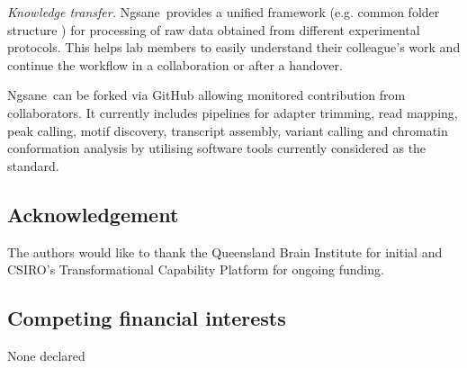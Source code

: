 \documentclass{bioinfo}
\newcommand{\prog}{{\sc Ngsane}}
\begin{document}
{\it Knowledge transfer.}
\prog\ provides a unified framework (e.g. common folder structure ) for processing of raw data obtained from different experimental protocols. 
This helps lab members to easily understand their colleague's work and continue the workflow in a collaboration or after a handover. 



\prog\ can be forked via GitHub allowing monitored contribution from collaborators. 
It currently includes pipelines for adapter trimming, read mapping, peak calling, motif discovery, transcript assembly, variant calling and chromatin conformation analysis by utilising software tools currently considered as the standard. 

\subsection*{Acknowledgement}
The authors would like to thank the Queensland Brain Institute for initial and CSIRO's Transformational Capability Platform for ongoing funding.  


\subsection*{Competing financial interests}
None declared



\end{document}
